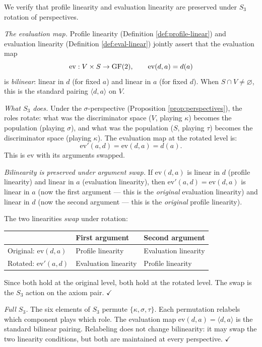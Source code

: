 We verify that profile linearity and evaluation linearity
are preserved under $S_3$ rotation of perspectives.

\emph{The evaluation map.}
Profile linearity (Definition \ref{def:profile-linear})
and evaluation linearity (Definition \ref{def:eval-linear})
jointly assert that the evaluation map
\[
  \mathrm{ev}: V \times S \to \operatorname{GF}(2), \qquad
  \mathrm{ev}(d, a) = d(a)
\]
is \emph{bilinear}: linear in $d$ (for fixed $a$) and
linear in $a$ (for fixed $d$). When $S \cap V \neq
\varnothing$, this is the standard pairing
$\langle d, a \rangle$ on $V$.

\emph{What $S_3$ does.}
Under the $\sigma$-perspective (Proposition
\ref{prop:perspectives}), the roles rotate: what was the
discriminator space ($V$, playing $\kappa$) becomes the
population (playing $\sigma$), and what was the population
($S$, playing $\tau$) becomes the discriminator space
(playing $\kappa$). The evaluation map at the rotated
level is:
\[
  \mathrm{ev}'(a, d) = \mathrm{ev}(d, a) = d(a).
\]
This is $\mathrm{ev}$ with its arguments swapped.

\emph{Bilinearity is preserved under argument swap.}
If $\mathrm{ev}(d, a)$ is linear in $d$ (profile
linearity) and linear in $a$ (evaluation linearity),
then $\mathrm{ev}'(a, d) = \mathrm{ev}(d, a)$ is
linear in $a$ (now the first argument --- this is the
\emph{original} evaluation linearity) and linear in $d$
(now the second argument --- this is the \emph{original}
profile linearity).

The two linearities \emph{swap} under rotation:
\begin{center}
\begin{tabular}{l|ll}
& First argument & Second argument \\
\hline
Original: $\mathrm{ev}(d, a)$ &
  Profile linearity &
  Evaluation linearity \\
Rotated: $\mathrm{ev}'(a, d)$ &
  Evaluation linearity &
  Profile linearity
\end{tabular}
\end{center}

Since both hold at the original level, both hold at the
rotated level. The swap is the $S_3$ action on the axiom
pair. $\checkmark$

\emph{Full $S_3$.}
The six elements of $S_3$ permute $\{\kappa, \sigma,
\tau\}$. Each permutation relabels which component plays
which role. The evaluation map $\mathrm{ev}(d, a) =
\langle d, a \rangle$ is the standard bilinear pairing.
Relabeling does not change bilinearity: it may swap the
two linearity conditions, but both are maintained at
every perspective. $\checkmark$

